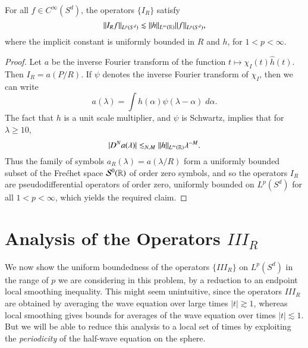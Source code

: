 \begin{lemma}
    For all $f \in C^\infty(S^d)$, the operators $\{ I_R \}$ satisfy
    \[ \| I_R f \|_{L^p(S^d)} \lesssim \| h \|_{L^\infty(\operatorname{\mathbb{R}})} \| f \|_{L^p(S^d)}, \] 
    where the implicit constant is uniformly bounded in $R$ and $h$, for $1 < p < \infty$.
\end{lemma}
\begin{proof}
    Let $a$ be the inverse Fourier transform of the function $t \mapsto \chi_I(t) \widehat{h}(t)$. Then $I_R = a(P/R)$. If $\psi$ denotes the inverse Fourier transform of $\chi_I$, then we can write
    \[ a(\lambda) = \int h(\alpha) \psi(\lambda - \alpha)\; d\alpha. \]
    The fact that $h$ is a unit scale multiplier, and $\psi$ is Schwartz, implies that for $\lambda \geq 10$,
    \[ |D^N a(\lambda)| \lesssim_{N,M} \| h \|_{L^\infty(\operatorname{\mathbb{R}})} \lambda^{-M}. \]
    Thus the family of symbols $a_R(\lambda) = a(\lambda / R)$ form a uniformly bounded subset of the Fre\'{c}het space $\mathcal{S}^0(\operatorname{\mathbb{R}})$ of order zero symbols, and so the operators $I_R$ are pseudodifferential operators of order zero, uniformly bounded on $L^p(S^d)$ for all $1 < p < \infty$, which yields the required claim.
\end{proof}

\section{Analysis of the Operators $III_R$}

We now show the uniform boundedness of the operators $\{ III_R \}$ on $L^p(S^d)$ in the range of $p$ we are considering in this problem, by a reduction to an endpoint local smoothing inequality. This might seem unintuitive, since the operators $III_R$ are obtained by averaging the wave equation over large times $|t| \gtrsim 1$, whereas local smoothing gives bounds for averages of the wave equation over times $|t| \lesssim 1$. But we will be able to reduce this analysis to a local set of times by exploiting the \emph{periodicity} of the half-wave equation on the sphere.


